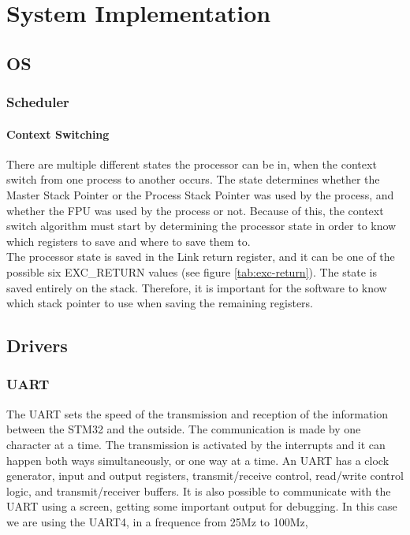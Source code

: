
\chapter{System Implementation}

\section{OS}

\subsection{Scheduler}

\subsubsection{Context Switching}
There are multiple different states the processor can be in, when the context switch from one process to another occurs.
The state determines whether the Master Stack Pointer or the Process Stack Pointer was used by the process,
and whether the FPU was used by the process or not. 
Because of this, the context switch algorithm must start by determining the processor state in order to know which registers
to save and where to save them to.\\
The processor state is saved in the Link return register, and it can be one of the possible six
EXC\_RETURN values (see figure \ref{tab:exc-return}).
The state is saved entirely on the stack. Therefore, it is important for the software to know which
stack pointer to use when saving the remaining registers.


\section{Drivers}

\subsection{UART}

The UART sets the speed of the transmission and reception of the information between the STM32 and the outside. The communication is made by one character at a time. The transmission is activated by the interrupts and it can happen both ways simultaneously, or one way at a time. An UART has a clock generator, input and output registers, transmit/receive control, read/write control logic, and transmit/receiver buffers.
It is also possible to communicate with the UART using a screen, getting some important output for debugging.
In this case we are using the UART4, in a frequence from 25Mz to 100Mz, 

